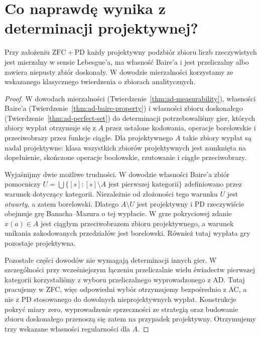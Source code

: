 \section{Co naprawdę wynika z determinacji projektywnej?}
\label{sec:pd-regularity}
\begin{twierdzenie}
\label{thm:pd-regularity}
Przy założeniu $\mathrm{ZFC}+\mathrm{PD}$ każdy
projektywny podzbiór zbioru liczb rzeczywistych
jest mierzalny w sensie Lebesgue'a, ma własność
Baire'a i jest przeliczalny albo zawiera
niepusty zbiór doskonały.
W dowodzie mierzalności korzystamy ze wskazanego
klasycznego twierdzenia o zbiorach analitycznych.
\end{twierdzenie}
\begin{proof}
W dowodach mierzalności
(Twierdzenie~\ref{thm:ad-measurability}),
własności Baire'a
(Twierdzenie~\ref{thm:ad-baire-property})
i własności zbioru doskonałego
(Twierdzenie~\ref{thm:ad-perfect-set})
do determinacji potrzebowaliśmy gier, których
zbiory wypłat otrzymuje się z $A$ przez ustalone
kodowania, operacje borelowskie i przeciwobrazy przez
funkcje ciągłe. Dla projektywnego $A$ takie zbiory
wypłat są nadal projektywne: klasa wszystkich zbiorów
projektywnych jest zamknięta na dopełnienie,
skończone operacje boolowskie, rzutowanie i ciągłe
przeciwobrazy.

Wyjaśnijmy dwie możliwe trudności.
W dowodzie własności Baire'a zbiór pomocniczy
$U=\bigcup\{[s]:[s]\setminus A\text{ jest pierwszej kategorii}\}$
zdefiniowano przez warunek dotyczący kategorii.
Niezależnie od złożoności tego warunku $U$ jest
\emph{otwarty}, a zatem borelowski. Dlatego
$A\setminus U$ jest projektywny i PD rzeczywiście
obejmuje grę Banacha--Mazura o tej wypłacie.
W grze pokryciowej zdanie $x(a)\in A$ jest
ciągłym przeciwobrazem zbioru projektywnego,
a warunek unikania zakodowanych przedziałów
jest borelowski. Również tutaj wypłata gry
pozostaje projektywna.

Pozostałe części dowodów nie wymagają
determinacji innych gier. W szczególności
przy wcześniejszym łączeniu przeliczalnie
wielu świadectw pierwszej kategorii
korzystaliśmy z wyboru przeliczalnego
wyprowadzonego z AD. Tutaj pracujemy
w ZFC, więc odpowiedni wybór otrzymujemy
bezpośrednio z AC, a nie z PD stosowanego
do dowolnych nieprojektywnych wypłat.
Konstrukcje pokryć miary zero, wyprowadzenie
sprzeczności ze strategią oraz budowanie
zbioru doskonałego przenoszą się zatem
na przypadek projektywny. Otrzymujemy trzy
wskazane własności regularności dla $A$.
\end{proof}

